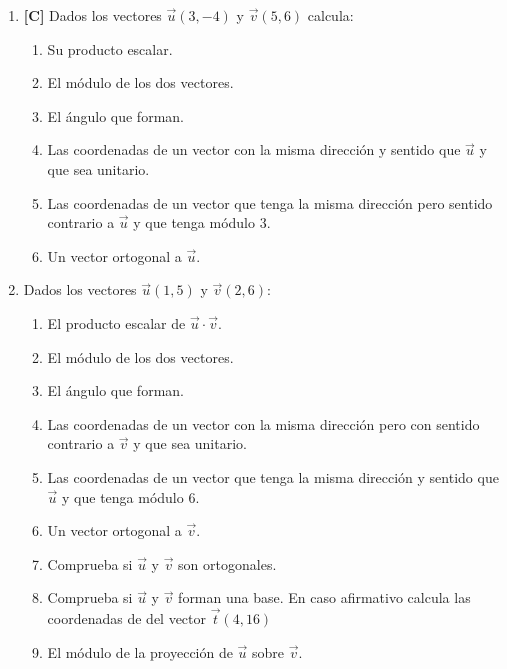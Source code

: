 \begin{enumerate}[topsep=0pt]
	
	\item \textbf{[C]}  Dados los vectores $ \overrightarrow{u}(3,-4)$ y $ \overrightarrow{v} (5,6) $ calcula:
	\begin{enumerate}[topsep=0pt, label=\arabic*)]
		\item Su producto escalar.
		\item El módulo de los dos vectores.
		\item El ángulo que forman.
		\item Las coordenadas de un vector con la misma dirección y sentido que $\overrightarrow{u}$ y que sea unitario.
		\item Las coordenadas de un vector que tenga la misma dirección pero sentido contrario a $\overrightarrow{u}$ y que tenga módulo 3.
		\item Un vector ortogonal a $\overrightarrow{u}$.
	\end{enumerate}


	\item Dados los vectores $ \overrightarrow{u}(1,5)$ y $ \overrightarrow{v} (2,6) $:
	\begin{enumerate}[topsep=0pt, label=\arabic*)]
		\item El producto escalar de $\overrightarrow{u} \cdot \overrightarrow{v}$.
		\item El módulo de los dos vectores.
		\item El ángulo que forman.
		\item Las coordenadas de un vector con la misma dirección  pero con sentido contrario a $\overrightarrow{v}$ y que sea unitario.
		\item Las coordenadas de un vector que tenga la misma dirección y sentido que $\overrightarrow{u}$ y que tenga módulo 6.
		\item Un vector ortogonal a $\overrightarrow{v}$.
		\item Comprueba si $\vec{u}$ y $\vec{v}$ son ortogonales.
		\item Comprueba si $\vec{u}$ y $\vec{v}$ forman una base. En caso afirmativo calcula las coordenadas de del vector $\overrightarrow{t}(4,16)$
		\item El módulo de la proyección de $\vec{u}$ sobre $\vec{v}$.
	\end{enumerate}



\end{enumerate}
